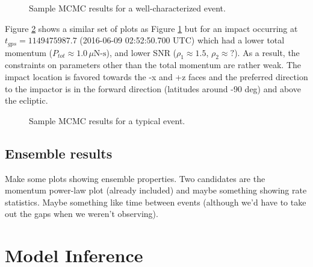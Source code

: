\documentclass[preprint, trackchanges]{aastex61}
\begin{document}
\begin{figure}[h!]
\caption{Sample MCMC results for a well-characterized event.\label{fig:goodExample}}
\end{figure}

Figure \ref{fig:Example} shows a similar set of plots as Figure \ref{fig:goodExample} but for an impact occurring at $t_{gps} = 1149475987.7$ (2016-06-09 02:52:50.700 UTC) which had a lower total momentum ($P_{tot}\approx1.0\,\mu\textrm{N-s}$), and lower SNR ($\rho_1\approx1.5$, $\rho_2\approx?$). As a result, the constraints on parameters other than the total momentum are rather weak.  The impact location is favored towards the -x and +z faces and the preferred direction to the impactor is in the forward direction (latitudes around -90 deg) and above the ecliptic.
\begin{figure}[h!]
\caption{Sample MCMC results for a typical event.\label{fig:Example}}
\end{figure}

\FloatBarrier
\subsection{Ensemble results}


Make some plots showing ensemble properties. Two candidates are the momentum power-law plot (already included) and maybe something showing rate statistics. Maybe something like time between events (although we'd have to take out the gaps when we weren't observing). 
\begin{figure}[ht!]
\end{figure}


\FloatBarrier
\section{Model Inference} \label{sec:models}
\end{document}

